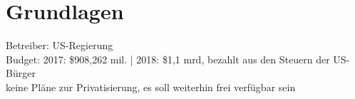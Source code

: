 \section{Grundlagen}
\label{sec:grundlagen}

Betreiber: US-Regierung \\
Budget: 2017: \$908,262 mil. | 2018: \$1,1 mrd,
bezahlt aus den Steuern der US-Bürger \\
keine Pläne zur Privatisierung, es soll weiterhin frei verfügbar sein
